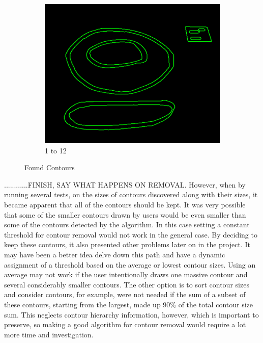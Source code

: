 \documentclass[11pt]{article}
\begin{document}
\begin{figure}
\begin{subfigure}[t]{0.32\textwidth}
		\includegraphics[scale=0.28]{pics/elimination/joinedAfterRemoval12.png}
		\caption{1 to 12}
		\label{construction12}
	\end{subfigure}
	\caption{Found Contours}
	\label{construction}
\end{figure}

............FINISH, SAY WHAT HAPPENS ON REMOVAL.
However, when by running several tests, on the sizes of contours discovered 
along with their sizes, it became apparent that all of the contours should be
kept. It was very possible that some of the smaller contours drawn by users 
would be even smaller than some of the contours detected by the algorithm. 
In this case setting a constant threshold for contour removal would not work
in the general case. By deciding to keep these contours, it also presented
other problems later on in the project. It may have been a better idea
delve down this path and have a dynamic assignment of a threshold based on
the average or lowest contour sizes. Using an average may not work if the user
intentionally draws one massive contour and several considerably smaller 
contours. The other option is to sort contour sizes and consider contours,
for example, were not needed if the sum of a subset of these contours, starting
from the largest, made up 90\% of the total contour size sum. This neglects 
contour hierarchy information, however, which is important to preserve, so
making a good algorithm for contour removal would require a lot more time
and investigation.\\
\\
\end{document}
